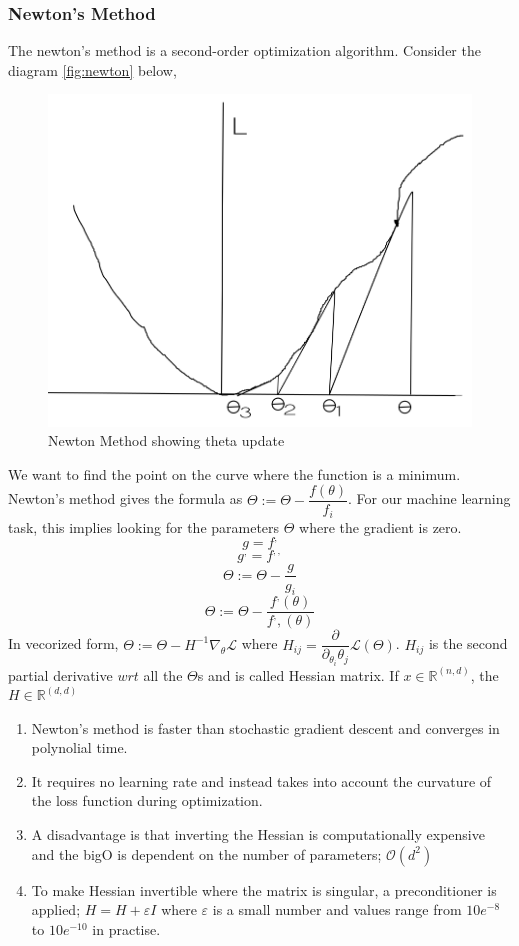 \documentclass[12pt,a4paper,titlepage,landscape]{book}
\begin{document}
	\subsubsection{Newton's Method}
	The newton's method is a second-order optimization algorithm.
	Consider the diagram \ref{fig:newton} below,  
	
	\begin{figure}
		\centering
		\includegraphics[width=0.5\linewidth, height=0.5\textheight]{loss-landscape}
		\caption{Newton Method showing theta update}
		\label{fig:loss-landscape}
	\end{figure}
	
	
	We want to find the point on the curve where the function is a minimum. Newton's method gives the formula as $\Theta := \Theta - \dfrac{f(\theta)}{f_i}$. For our machine learning task, this implies looking for the parameters $\Theta$ where the gradient is zero. 
	$$g = f^,$$ $$g^, = f^{,,}$$
	$$\Theta := \Theta - \dfrac{g}{g_i}$$
	$$\Theta := \Theta - \dfrac{f^,(\theta)}{f^,,(\theta)}$$
	In vecorized form, $\Theta := \Theta - H^{-1}\nabla_\theta\mathcal{L}$ where $H_{ij} = \dfrac{\partial}{\partial_{\theta_i}\theta_j}\mathcal{L}(\Theta)$. $H_{ij}$ is the second partial derivative $wrt$ all the $\Theta$s and is called Hessian matrix. If $x \in \mathbb{R}^{(n, d)}$, the $H \in \mathbb{R}^{(d, d)} $ \\
	
	\begin{enumerate}
		\item Newton's method is faster than stochastic gradient descent and converges in polynolial time.
		\item It requires no learning rate and instead takes into account the curvature of the loss function during optimization.
		\item A disadvantage is that inverting the Hessian is computationally expensive and the bigO is dependent on the number of parameters; $\mathcal{O}(d^2)$ 
		\item To make Hessian invertible where the matrix is singular, a preconditioner is applied; $H = H + \varepsilon{I}$ where $\varepsilon$ is a small number and values range from $10e^{-8}$ to $10e^{-10}$ in practise.
	
	\end{enumerate}
\end{document}
